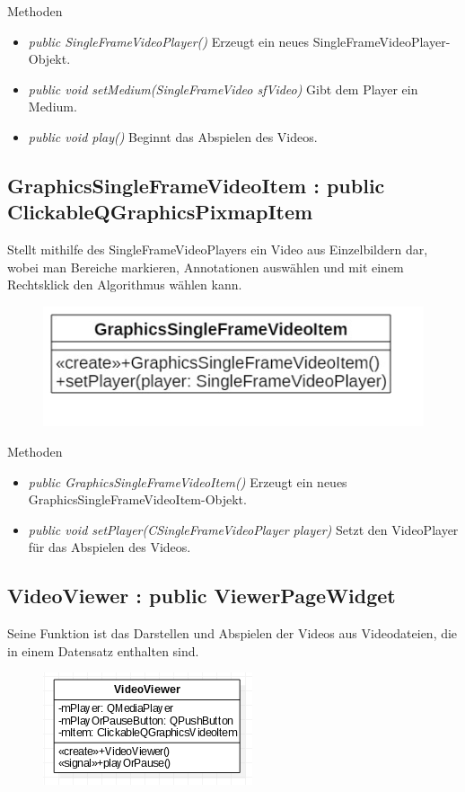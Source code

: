 Methoden
\begin{itemize}
	\item\textit{public SingleFrameVideoPlayer()} 
	Erzeugt ein neues SingleFrameVideoPlayer-Objekt.
	\item\textit{public void setMedium(SingleFrameVideo sfVideo)} 
	Gibt dem Player ein Medium.
	\item\textit{public void play()} 
	Beginnt das Abspielen des Videos.
\end{itemize}

\subsection*{GraphicsSingleFrameVideoItem : public ClickableQGraphicsPixmapItem}
Stellt mithilfe des SingleFrameVideoPlayers ein Video aus Einzelbildern dar, wobei man Bereiche markieren, Annotationen auswählen und mit einem Rechtsklick den Algorithmus wählen kann.

\begin{figure}[H]
	\centering
	\includegraphics[scale=0.5]{img/Klassendiagramm/Klassen/View/GraphicsSingleFrameVideoItem}
	\label{fig:graphicsSingleFrameVideoItem}
\end{figure}

Methoden
\begin{itemize}
	\item\textit{public GraphicsSingleFrameVideoItem()} 
	Erzeugt ein neues GraphicsSingleFrameVideoItem-Objekt.
	\item\textit{public void setPlayer(CSingleFrameVideoPlayer player)} 
	Setzt den VideoPlayer für das Abspielen des Videos.
\end{itemize}

\subsection*{VideoViewer : public ViewerPageWidget}
Seine Funktion ist das Darstellen und Abspielen der Videos aus Videodateien, die in einem Datensatz enthalten sind.

\begin{figure}[H]
	\centering
	\includegraphics[scale=0.5]{img/Klassendiagramm/Klassen/View/VideoViewer}
	\label{fig:videoViewer}
\end{figure}


